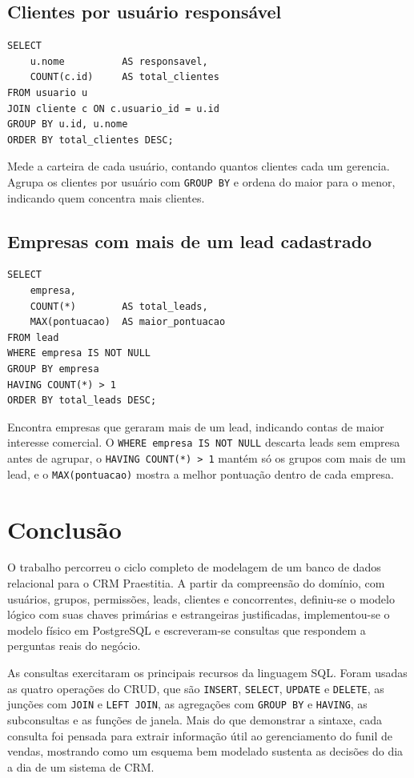 \documentclass[a4paper]{article}
\begin{document}
\subsection{Clientes por usuário responsável}

\begin{verbatim}
SELECT
    u.nome          AS responsavel,
    COUNT(c.id)     AS total_clientes
FROM usuario u
JOIN cliente c ON c.usuario_id = u.id
GROUP BY u.id, u.nome
ORDER BY total_clientes DESC;
\end{verbatim}

Mede a carteira de cada usuário, contando quantos clientes cada um gerencia. Agrupa os
clientes por usuário com \texttt{GROUP BY} e ordena do maior para o menor, indicando quem
concentra mais clientes.

\subsection{Empresas com mais de um lead cadastrado}

\begin{verbatim}
SELECT
    empresa,
    COUNT(*)        AS total_leads,
    MAX(pontuacao)  AS maior_pontuacao
FROM lead
WHERE empresa IS NOT NULL
GROUP BY empresa
HAVING COUNT(*) > 1
ORDER BY total_leads DESC;
\end{verbatim}

Encontra empresas que geraram mais de um lead, indicando contas de maior interesse
comercial. O \texttt{WHERE empresa IS NOT NULL} descarta leads sem empresa antes de
agrupar, o \texttt{HAVING COUNT(*) > 1} mantém só os grupos com mais de um lead, e o
\texttt{MAX(pontuacao)} mostra a melhor pontuação dentro de cada empresa.

\section{Conclusão}

O trabalho percorreu o ciclo completo de modelagem de um banco de dados relacional para o
CRM Praestitia. A partir da compreensão do domínio, com usuários, grupos, permissões,
leads, clientes e concorrentes, definiu-se o modelo lógico com suas chaves primárias e
estrangeiras justificadas, implementou-se o modelo físico em PostgreSQL e escreveram-se
consultas que respondem a perguntas reais do negócio.

As consultas exercitaram os principais recursos da linguagem SQL. Foram usadas as quatro
operações do CRUD, que são \texttt{INSERT}, \texttt{SELECT}, \texttt{UPDATE} e
\texttt{DELETE}, as junções com \texttt{JOIN} e \texttt{LEFT JOIN}, as agregações com
\texttt{GROUP BY} e \texttt{HAVING}, as subconsultas e as funções de janela. Mais do que
demonstrar a sintaxe, cada consulta foi pensada para extrair informação útil ao
gerenciamento do funil de vendas, mostrando como um esquema bem modelado sustenta as
decisões do dia a dia de um sistema de CRM.
\end{document}
